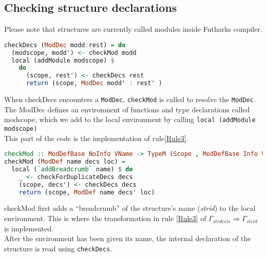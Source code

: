\subsection{Checking structure declarations}
Please note that structures are currently called modules inside Futharks compiler.
\begin{lstlisting}[language=Haskell]
checkDecs (ModDec modd:rest) = do
  (modscope, modd') <- checkMod modd
  local (addModule modscope) $
    do
      (scope, rest') <- checkDecs rest
      return (scope, ModDec modd' : rest' )
\end{lstlisting}
When checkDecs encounters a \texttt{ModDec}, \texttt{checkMod} is called to resolve the \texttt{ModDec}.
The ModDec defines an environment of functions and type declarations called
modscope, which we add to the local environment by calling \texttt{local
  (addModule modscope)}\\
This part of the code is the implementation of rule\ref{Rule3}.
\begin{lstlisting}[language=Haskell]
checkMod :: ModDefBase NoInfo VName -> TypeM (Scope , ModDefBase Info VName)
checkMod (ModDef name decs loc) =
  local (`addBreadcrumb` name) $ do
    _ <- checkForDuplicateDecs decs
    (scope, decs') <- checkDecs decs
    return (scope, ModDef name decs' loc)
\end{lstlisting}
checkMod first adds a ``breadcrumb'' of the structure's name (\textit{strid}) to
the local environment. This is where the transformation in rule \ref{Rule3} of
$\Gamma_{strdecls} \Rightarrow \Gamma_{strid}$ is implemented.
\\
After the environment has been given its name, the internal declaration of the
structure is read using \texttt{checkDecs}.
\\
